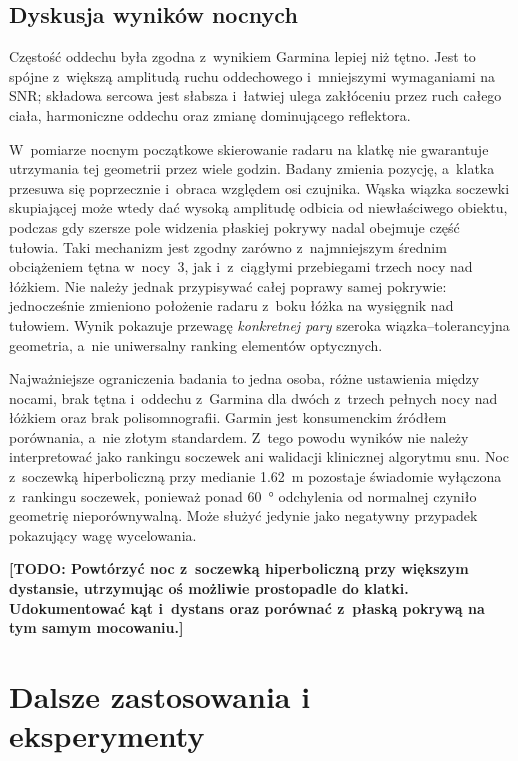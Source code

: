\documentclass[12pt,a4paper,oneside]{report}
\newcommand{\todo}[1]{\textcolor{red!75!black}{\textbf{[TODO: #1]}}}
\begin{document}
\section{Dyskusja wyników nocnych}
Częstość oddechu była zgodna z~wynikiem Garmina lepiej niż tętno. Jest to
spójne z~większą amplitudą ruchu oddechowego i~mniejszymi wymaganiami na SNR;
składowa sercowa jest słabsza i~łatwiej ulega zakłóceniu przez ruch całego
ciała, harmoniczne oddechu oraz zmianę dominującego reflektora.

W~pomiarze nocnym początkowe skierowanie radaru na klatkę nie gwarantuje
utrzymania tej geometrii przez wiele godzin. Badany zmienia pozycję, a~klatka
przesuwa się poprzecznie i~obraca względem osi czujnika. Wąska wiązka soczewki
skupiającej może wtedy dać wysoką amplitudę odbicia od niewłaściwego obiektu,
podczas gdy szersze pole widzenia płaskiej pokrywy nadal obejmuje część
tułowia. Taki mechanizm jest zgodny zarówno z~najmniejszym średnim obciążeniem
tętna w~nocy~3, jak i~z~ciągłymi przebiegami trzech nocy nad łóżkiem.
Nie należy jednak przypisywać całej poprawy samej pokrywie: jednocześnie zmieniono
położenie radaru z~boku łóżka na wysięgnik nad tułowiem. Wynik pokazuje
przewagę \emph{konkretnej pary} szeroka wiązka--tolerancyjna geometria, a~nie
uniwersalny ranking elementów optycznych.

Najważniejsze ograniczenia badania to jedna osoba, różne ustawienia między
nocami, brak tętna i~oddechu z~Garmina dla dwóch z~trzech pełnych nocy nad łóżkiem oraz
brak polisomnografii. Garmin jest konsumenckim źródłem porównania, a~nie
złotym standardem. Z~tego powodu wyników nie należy interpretować jako
rankingu soczewek ani walidacji klinicznej algorytmu snu. Noc z~soczewką
hiperboliczną przy medianie \SI{1.62}{m} pozostaje świadomie wyłączona
z~rankingu soczewek, ponieważ ponad \SI{60}{\degree} odchylenia od normalnej
czyniło geometrię nieporównywalną. Może służyć jedynie jako negatywny przypadek
pokazujący wagę wycelowania.

\todo{Powtórzyć noc z~soczewką hiperboliczną przy większym dystansie,
utrzymując oś możliwie prostopadle do klatki. Udokumentować kąt i~dystans oraz
porównać z~płaską pokrywą na tym samym mocowaniu.}

\chapter{Dalsze zastosowania i eksperymenty}
\end{document}
